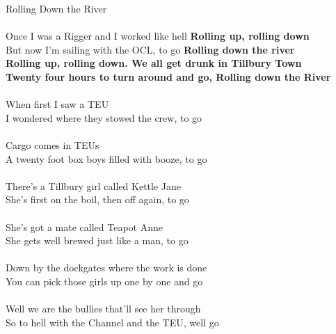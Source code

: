 \documentclass[letterpaper,9pt]{article}
\begin{document}
\newpage
{}
\huge
Rolling Down the River\\
\\
\LARGE
Once I was a Rigger and I worked like hell \textbf{Rolling up, rolling down}
\\But now I'm sailing with the OCL, to go \textbf{Rolling down the river
\\Rolling up, rolling down. We all get drunk in Tillbury Town
\\Twenty four hours to turn around and go, Rolling down the River}
\\
\\When first I saw a TEU
\\I wondered where they stowed the crew, to go
\\
\\Cargo comes in TEUs
\\A twenty foot box boys filled with booze, to go
\\
\\There's a Tillbury girl called Kettle Jane
\\She's first on the boil, then off again, to go
\\
\\She's got a mate called Teapot Anne
\\She gets well brewed just like a man, to go
\\
\\Down by the dockgates where the work is done
\\You can pick those girls up one by one and go
\\
\\Well we are the bullies that'll see her through
\\So to hell with the Channel and the TEU, well go
\end{document}
